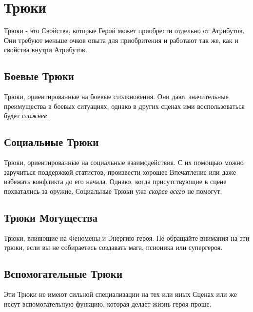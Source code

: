 \section{Трюки}
Трюки - это Свойства, которые Герой может приобрести отдельно от Атрибутов. Они требуют меньше очков опыта для приобритения и работают так же, как и свойства внутри Атрибутов.

\subsection{Боевые Трюки}
Трюки, ориентированные на боевые столкновения. Они дают значительные преимущества в боевых ситуациях, однако в других сценах ими воспользоваться будет \textit{сложнее}.

\subsection{Социальные Трюки}
Трюки, ориентированные на социальные взаимодействия. С их помощью можно заручиться поддержкой статистов, произвести хорошее Впечатление или даже избежать конфликта до его начала. Однако, когда присутствующие в сцене похватались за оружие, Социальные Трюки уже \textit{скорее всего} не помогут.

\ifx\islight\undefined
\subsection{Трюки Могущества}
Трюки, влияющие на Феномены и Энергию героя. Не обращайте внимания на эти трюки, если вы не собираетесь создавать мага, псионика или супергероя.
\fi

\subsection{Вспомогательные Трюки}
Эти Трюки не имеют сильной специализации на тех или иных Сценах или же несут вспомогательную функцию, которая делает жизнь героя проще.

\printindex[tricks]